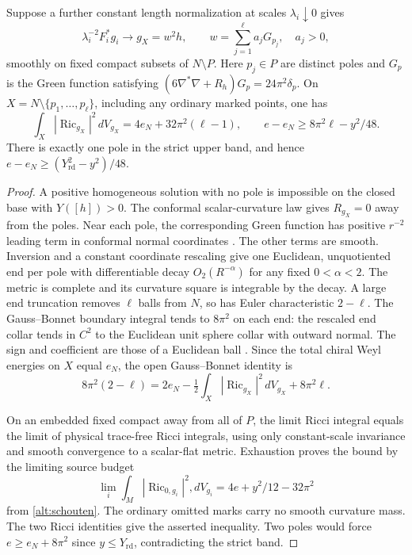 \begin{theorem}\label{alt:green}
Suppose a further constant length normalization at scales
\(\lambda_i\downarrow0\) gives
\[
 \lambda_i^{-2}F_i^*g_i\longrightarrow g_X=w^2h,\qquad
 w=\sum_{j=1}^{\ell}a_jG_{p_j},\quad a_j>0,
\]
smoothly on fixed compact subsets of \(N\setminus P\).
Here \(p_j\in P\) are distinct poles and \(G_p\) is the Green
function satisfying
\((6\nabla^*\nabla+R_h)G_p=24\pi^2\delta_p\).
On \(X=N\setminus\{p_1,\ldots,p_\ell\}\), including any ordinary
marked points, one has
\[
 \int_X |\operatorname{Ric}_{g_X}|^2\,dV_{g_X}
       =4e_N+32\pi^2(\ell-1),\qquad
 e-e_N\ge 8\pi^2\ell-y^2/48 .
\]
There is exactly one pole in the strict upper band, and hence
\(e-e_N\ge(Y_{\mathrm{rd}}^2-y^2)/48\).
\end{theorem}

\begin{proof}
A positive homogeneous solution with no pole is impossible on the
closed base with \(Y([h])>0\). The conformal scalar-curvature law
gives \(R_{g_X}=0\) away from the poles. Near each pole,
the corresponding Green function has positive \(r^{-2}\) leading
term in conformal normal coordinates
\cite[Lemma 6.4 and Theorem 6.5]{LeeParker1987Yamabe}. The other
terms are smooth. Inversion and a constant coordinate rescaling
give one Euclidean, unquotiented end per pole with differentiable
decay \(O_2(R^{-\alpha})\) for any fixed \(0<\alpha<2\).
The metric is complete and its curvature square is integrable
by the decay. A large end truncation removes \(\ell\) balls from
\(N\), so has Euler characteristic \(2-\ell\).
The Gauss--Bonnet boundary integral tends to \(8\pi^2\) on each
end: the rescaled end collar tends in \(C^2\) to the Euclidean
unit sphere collar with outward normal. The sign and coefficient
are those of a Euclidean ball
\cite[\S7, equation (7.2)]{TianViaclovsky2005ALE}. Since the
total chiral Weyl energies on \(X\) equal \(e_N\), the open
Gauss--Bonnet identity is
\[
 8\pi^2(2-\ell)=2e_N-\tfrac12
       \int_X|\operatorname{Ric}_{g_X}|^2\,dV_{g_X}
       +8\pi^2\ell .
\]

On an embedded fixed compact away from all of \(P\), the limit
Ricci integral equals the limit of physical trace-free Ricci
integrals, using only constant-scale invariance and smooth
convergence to a scalar-flat metric. Exhaustion proves the bound
by the limiting source budget
\[
 \lim_i\int_M|\operatorname{Ric}_{0,g_i}|^2,dV_{g_i}
     =4e+y^2/12-32\pi^2
\]
from \eqref{alt:schouten}. The ordinary omitted marks carry
no smooth curvature mass. The two Ricci identities give the
asserted inequality. Two poles would force \(e\ge e_N+8\pi^2\)
since \(y\le Y_{\mathrm{rd}}\), contradicting the strict band.
\end{proof}

